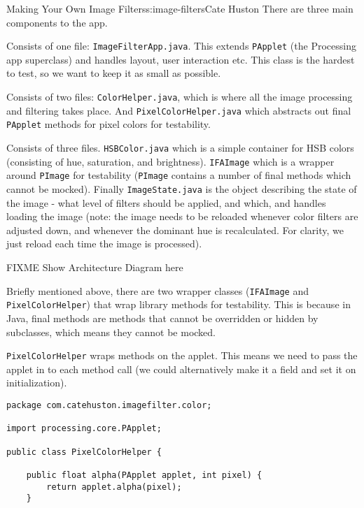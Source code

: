 \begin{aosachapter}{Making Your Own Image Filters}{s:image-filters}{Cate Huston}
There are three main components to the app.

\label{the-app-1}

Consists of one file: \texttt{ImageFilterApp.java}. This extends
\texttt{PApplet} (the Processing app superclass) and handles layout,
user interaction etc. This class is the hardest to test, so we want to
keep it as small as possible.

\label{color-1}

Consists of two files: \texttt{ColorHelper.java}, which is where all the
image processing and filtering takes place. And
\texttt{PixelColorHelper.java} which abstracts out final
\texttt{PApplet} methods for pixel colors for testability.

\label{model}

Consists of three files. \texttt{HSBColor.java} which is a simple
container for HSB colors (consisting of hue, saturation, and
brightness). \texttt{IFAImage} which is a wrapper around \texttt{PImage}
for testability (\texttt{PImage} contains a number of final methods
which cannot be mocked). Finally \texttt{ImageState.java} is the object
describing the state of the image - what level of filters should be
applied, and which, and handles loading the image (note: the image needs
to be reloaded whenever color filters are adjusted down, and whenever
the dominant hue is recalculated. For clarity, we just reload each time
the image is processed).

FIXME Show Architecture Diagram here

\label{wrapper-classes-and-tests}

Briefly mentioned above, there are two wrapper classes
(\texttt{IFAImage} and \texttt{PixelColorHelper}) that wrap library
methods for testability. This is because in Java, final methods are
methods that cannot be overridden or hidden by subclasses, which means
they cannot be mocked.

\texttt{PixelColorHelper} wraps methods on the applet. This means we
need to pass the applet in to each method call (we could alternatively
make it a field and set it on initialization).

\begin{verbatim}
package com.catehuston.imagefilter.color;

import processing.core.PApplet;

public class PixelColorHelper {

    public float alpha(PApplet applet, int pixel) {
        return applet.alpha(pixel);
    }


\end{verbatim}
\end{aosachapter}
